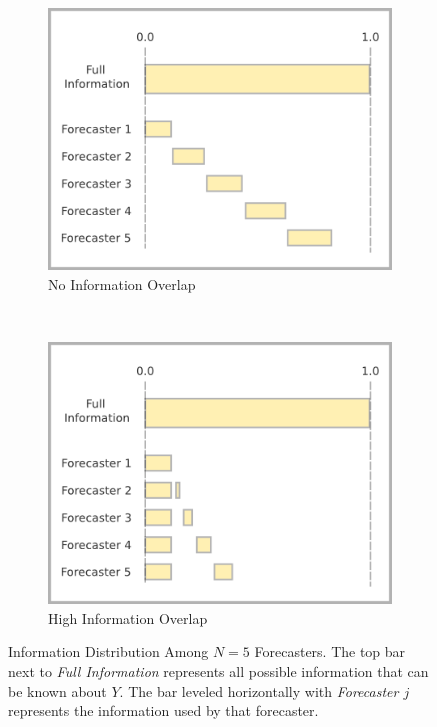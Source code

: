 \documentclass[11pt]{article}
\theoremstyle{definition}
\theoremstyle{definition}
\begin{document}
\begin{figure}[t!]
        \centering
        \begin{subfigure}[b]{0.49\textwidth}
                \includegraphics[width=\textwidth]{IndepDiagram}
                \caption{No Information Overlap}
                \label{DiagramsA}
        \end{subfigure}%
        ~ %
        \begin{subfigure}[b]{0.49\textwidth}
                \includegraphics[width=\textwidth]{DepDiagram}
                \caption{High Information Overlap}
                \label{DiagramsB}
        \end{subfigure}
   \caption{Information Distribution Among $N = 5$ Forecasters. The top bar next to \textit{Full Information} represents all possible information that can be known about $Y$. The bar leveled horizontally with \textit{Forecaster $j$} represents the information used by that forecaster.}    
        \label{Diagrams}
\end{figure}
\end{document}
